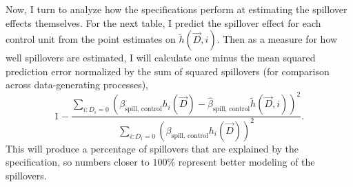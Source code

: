 \documentclass[11pt]{article}
\begin{document}
Now, I turn to analyze how the specifications perform at estimating the spillover effects themselves. For the next table, I predict the spillover effect for each control unit from the point estimates on $\tilde{h}(\vec{D}, i)$. Then as a measure for how well spillovers are estimated, I will calculate one minus the mean squared prediction error normalized by the sum of squared spillovers (for comparison across data-generating processes), 
\begin{equation}\label{eq:mspe}
    1 - \frac{\sum_{i: D_i = 0} (\beta_{\text{spill, control}} h_i(\vec{D}) - \hat{\beta}_{\text{spill, control}} \tilde{h}(\vec{D}, i))^2}{\sum_{i: D_i = 0} (\beta_{\text{spill, control}} h_i(\vec{D}))^2}.
\end{equation} 
This will produce a percentage of spillovers that are explained by the specification, so numbers closer to $100\%$ represent better modeling of the spillovers. 
\end{document}
